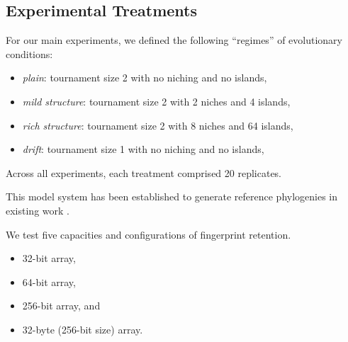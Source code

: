 \subsection{Experimental Treatments}

For our main experiments, we defined the following ``regimes'' of evolutionary conditions:
\begin{itemize}
  \item \textit{plain}: tournament size 2 with no niching and no islands,
  \item \textit{mild structure}: tournament size 2 with 2 niches and 4 islands,
  \item \textit{rich structure}: tournament size 2 with 8 niches and 64 islands,
  \item \textit{drift}: tournament size 1 with no niching and no islands,
\end{itemize}



Across all experiments, each treatment comprised 20 replicates.

This model system has been established to generate reference phylogenies in existing work \citep{moreno2023toward,moreno2024ecology}.

We test five capacities and configurations of fingerprint retention.
\begin{itemize}
  \item 32-bit array,
  \item 64-bit array,
  \item 256-bit array, and
  \item 32-byte (256-bit size) array.
\end{itemize}


